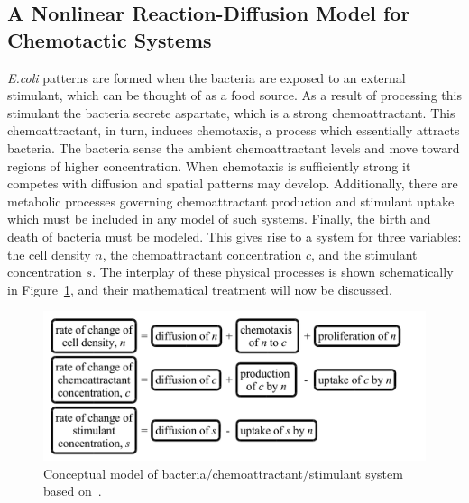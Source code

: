 \subsection{A Nonlinear Reaction-Diffusion Model for Chemotactic Systems}
\emph{E.coli} patterns are formed when the bacteria are exposed to an external stimulant, which can be thought of as a food source.  As a result of processing this stimulant the bacteria secrete aspartate, which is a strong chemoattractant.  This chemoattractant, in turn, induces chemotaxis, a process which essentially attracts bacteria.  The bacteria sense the ambient chemoattractant levels and move toward regions of higher concentration.   When chemotaxis is sufficiently strong it competes with diffusion and spatial patterns may develop.  Additionally, there are metabolic processes governing chemoattractant production and stimulant uptake which must be included in any model of such systems. Finally, the birth and death of bacteria must be modeled. This gives rise to a system for three variables: the cell density $n$, the chemoattractant concentration $c$, and the stimulant concentration $s$.  %
The interplay of these physical processes is shown schematically in Figure~\ref{fig:conceptual_model}, and their mathematical treatment will now be discussed.
 \begin{figure}[hbpt]
   \begin{center}
     \includegraphics[width=\textwidth]{figures/bio/conceptual_model}
     \caption[Conceptual model of bacteria/chemoattractant/stimulant system.]{Conceptual model of bacteria/chemoattractant/stimulant system based on~\cite{spatial_patters_in_bio}.\label{fig:conceptual_model}}
   \end{center}
 \end{figure}

